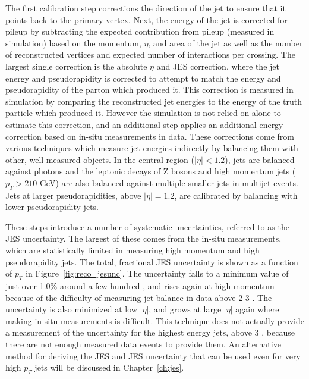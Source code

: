 The first calibration step corrections the direction of the jet to ensure that it points back to the primary vertex.
Next, the energy of the jet is corrected for pileup by subtracting the expected contribution from pileup (measured in simulation) based on the momentum, $\eta$, and area of the jet as well as the number of reconstructed vertices and expected number of interactions per crossing.
The largest single correction is the absolute $\eta$ and \ac{JES} correction, where the jet energy and pseudorapidity is corrected to attempt to match the energy and pseudorapidity of the parton which produced it.
This correction is measured in simulation by comparing the reconstructed jet energies to the energy of the truth particle which produced it.
However the simulation is not relied on alone to estimate this correction, and an additional step applies an additional energy correction based on in-situ measurements in data.
These corrections come from various techniques which measure jet energies indirectly by balancing them with other, well-measured objects.
In the central region ($|\eta| < 1.2$), jets are balanced against photons and the leptonic decays of Z bosons and high momentum jets ($p_T > 210$ GeV) are also balanced against multiple smaller jets in multijet events.
Jets at larger pseudorapidities, above $|\eta| = 1.2$, are calibrated by balancing with lower pseudorapidity jets.

These steps introduce a number of systematic uncertainties, referred to as the \ac{JES} uncertainty.
The largest of these comes from the in-situ measurements, which are statistically limited in measuring high momentum and high pseudorapidity jets.
The total, fractional \ac{JES} uncertainty is shown as a function of $p_T$ in Figure~\ref{fig:reco_jesunc}.
The uncertainty falls to a minimum value of just over 1.0\% around a few hundred \GeV, and rises again at high momentum because of the difficulty of measuring jet balance in data above 2-3 \TeV.
The uncertainty is also minimized at low $|\eta|$, and grows at large $|\eta|$ again where making in-situ measurements is difficult.
This technique does not actually provide a measurement of the uncertainty for the highest energy jets, above 3 \TeV, because there are not enough measured data events to provide them.
An alternative method for deriving the \ac{JES} and \ac{JES} uncertainty that can be used even for very high $p_T$ jets will be discussed in Chapter~\ref{ch:jes}.

